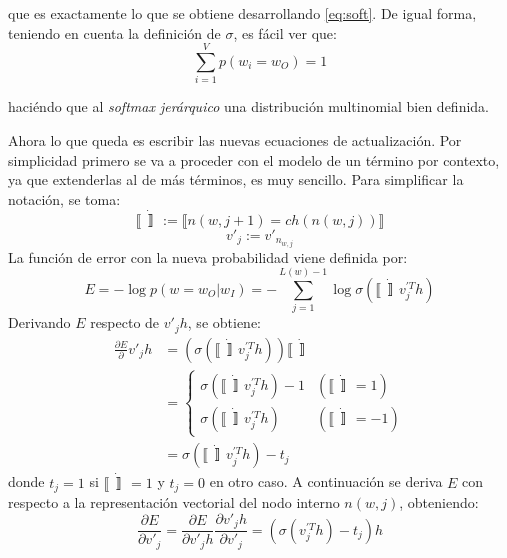 que es exactamente lo que se obtiene desarrollando \ref{eq:soft}. De igual forma, teniendo en cuenta la definición de $\sigma$, es fácil ver que:
\begin{equation}
  \sum_{i=1}^Vp\left( w_i = w_O \right) = 1
\end{equation}

haciéndo que al \textit{softmax jerárquico} una distribución multinomial bien definida.

Ahora lo que queda es escribir las nuevas ecuaciones de actualización. Por simplicidad primero se va a proceder con el modelo de un término por contexto, ya que extenderlas
al de más términos, es muy sencillo. Para simplificar la notación, se toma:
\begin{equation}
  \llbracket \dot \rrbracket := \llbracket  n(w, j+1) = ch(n(w,j)) \rrbracket
\end{equation}
\begin{equation}
  v'_j := v'_{n_{w,j}}
\end{equation}
La función de error con la nueva probabilidad viene definida por:
\begin{equation}
  E = - \log p\left( w=w_O|w_I \right) = - \sum_{j=1}^{L(w) - 1} \log\sigma\left( \llbracket \dot \rrbracket v^{'T}_jh \right)
\end{equation}
Derivando $E$ respecto de $v'_jh$, se obtiene:
\begin{align}
  \frac{\partial E}\partial v'_j h{} & = \left( \sigma\left( \llbracket \dot \rrbracket v^{'T}_jh \right) \right) \llbracket \dot \rrbracket \\
                                     & = \begin{cases}
                                      \sigma\left( \llbracket \dot \rrbracket v^{'T}_jh \right) - 1 & (\llbracket \dot \rrbracket = 1) \\
                                      \sigma\left( \llbracket \dot \rrbracket v^{'T}_jh \right) & (\llbracket \dot \rrbracket = -1)
                                    \end{cases} \\
                                    & = \sigma\left( \llbracket \dot \rrbracket v^{'T}_jh \right) - t_j
\end{align}
donde $t_j=1$ si $\llbracket \dot \rrbracket = 1$ y $t_j=0$ en otro caso. A continuación se deriva $E$ con respecto a la representación vectorial del nodo interno $n(w,j)$, obteniendo:
\begin{equation}
  \frac{\partial E}{\partial v'_j} = \frac{\partial E}{\partial v'_j h} \frac{\partial v'_jh}{\partial v'_j} = \left( \sigma\left( v^{'T}_j h \right) - t_j \right) h
\end{equation}
